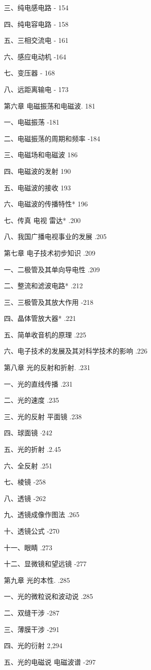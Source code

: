 \documentclass[10pt]{article}
\begin{document}
三、纯电感电路 - 154

四、纯电容电路 - 158

五、三相交流电 - 161

六、感应电动机 -164

七、变压器 - 168

八、远距离输电 - 173

第六章 电磁振荡和电磁波. 181

一、电磁振荡 -181

二、电磁振荡的周期和频率 -184

三、电磁场和电磁波 186

四、电磁波的发射 190

五、电磁波的接收 193

六、电磁波的传播特性* 196

七、传真 电视 雷达* .200

八、我国广播电视事业的发展 .205

第七章 电子技术初步知识 .209

一、二极管及其单向导电性 .209

二、整流和滤波电路* .212

三、三极管及其放大作用 -218

四、晶体管放大器* .221

五、简单收音机的原理 .225

六、电子技术的发展及其对科学技术的影响 .226

第八章 光的反射和折射. .231

一、光的直线传播 .231

二、光的速度 .235

三、光的反射 平面镜 .238

四、球面镜 \(\cdot {242}\)

五、光的折射 .2.45

六、全反射 .251

七、棱镜 -258

八、透镜 -262

九、透镜成像作图法 .265

十、透镜公式 -270

十一、眼睛 .273

十二、显微镜和望远镜 -277

第九章 光的本性. .285

一、光的微粒说和波动说 .285

二、双缝干涉 -287

三、薄膜干涉 -291

四、光的衍射 2,294

五、光的电磁说 电磁波谱 -297
\end{document}
